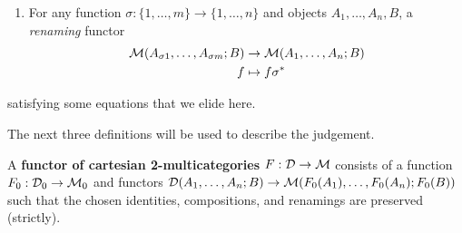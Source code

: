 \begin{definition}
\begin{enumerate}
  \item For any function $\sigma : \{1,\dots,m\} \to \{1,\dots,n\}$ and
    objects $A_1,\dots,A_n,B$, a \emph{renaming} functor
    \begin{align*}
      \mathcal{M}(A_{\sigma 1},\dots,A_{\sigma m}; B) &\to \mathcal{M}(A_1,\dots,A_n;B)\\
      f &\mapsto f\sigma^*
    \end{align*}
  \end{enumerate}
satisfying some equations that we elide here.  
\end{definition}

The next three definitions will be used to describe the
 judgement.  

\begin{definition}
  A \textbf{functor of cartesian 2-multicategories} $F:\mathcal{D}\to\mathcal{M}$ consists
  of a function $F_0 : \mathcal{D}_0 \to \mathcal{M}_0$ and functors $\mathcal{D}(A_1,\ldots,A_n;B)
  \to \mathcal{M}(F_0(A_1),\ldots,F_0(A_n);F_0(B))$ such that the chosen
  identities, compositions, and renamings are preserved (strictly).
\end{definition}

